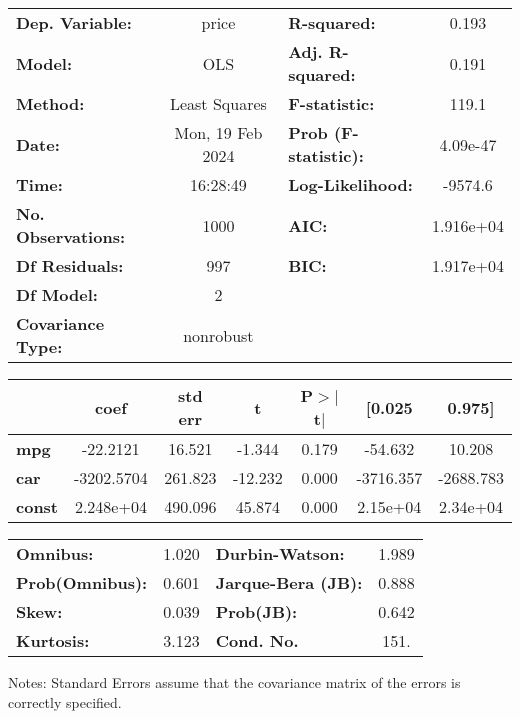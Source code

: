 \begin{center}
\begin{tabular}{lclc}
\toprule
\textbf{Dep. Variable:}    &      price       & \textbf{  R-squared:         } &     0.193   \\
\textbf{Model:}            &       OLS        & \textbf{  Adj. R-squared:    } &     0.191   \\
\textbf{Method:}           &  Least Squares   & \textbf{  F-statistic:       } &     119.1   \\
\textbf{Date:}             & Mon, 19 Feb 2024 & \textbf{  Prob (F-statistic):} &  4.09e-47   \\
\textbf{Time:}             &     16:28:49     & \textbf{  Log-Likelihood:    } &   -9574.6   \\
\textbf{No. Observations:} &        1000      & \textbf{  AIC:               } & 1.916e+04   \\
\textbf{Df Residuals:}     &         997      & \textbf{  BIC:               } & 1.917e+04   \\
\textbf{Df Model:}         &           2      & \textbf{                     } &             \\
\textbf{Covariance Type:}  &    nonrobust     & \textbf{                     } &             \\
\bottomrule
\end{tabular}
\begin{tabular}{lcccccc}
               & \textbf{coef} & \textbf{std err} & \textbf{t} & \textbf{P$> |$t$|$} & \textbf{[0.025} & \textbf{0.975]}  \\
\midrule
\textbf{mpg}   &     -22.2121  &       16.521     &    -1.344  &         0.179        &      -54.632    &       10.208     \\
\textbf{car}   &   -3202.5704  &      261.823     &   -12.232  &         0.000        &    -3716.357    &    -2688.783     \\
\textbf{const} &    2.248e+04  &      490.096     &    45.874  &         0.000        &     2.15e+04    &     2.34e+04     \\
\bottomrule
\end{tabular}
\begin{tabular}{lclc}
\textbf{Omnibus:}       &  1.020 & \textbf{  Durbin-Watson:     } &    1.989  \\
\textbf{Prob(Omnibus):} &  0.601 & \textbf{  Jarque-Bera (JB):  } &    0.888  \\
\textbf{Skew:}          &  0.039 & \textbf{  Prob(JB):          } &    0.642  \\
\textbf{Kurtosis:}      &  3.123 & \textbf{  Cond. No.          } &     151.  \\
\bottomrule
\end{tabular}
\end{center}

Notes: \newline
 [1] Standard Errors assume that the covariance matrix of the errors is correctly specified.